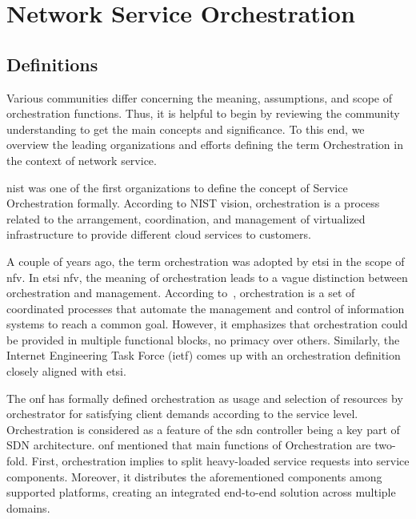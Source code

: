 \section{Network Service Orchestration}
\label{sec:nso}

\subsection{Definitions}
\label{sec:orchdef}

Various communities differ concerning the meaning, assumptions, and scope of orchestration functions. Thus, it is helpful to begin by reviewing the community understanding to get the main concepts and significance. To this end, we overview the leading organizations and efforts defining the term Orchestration in the context of network service.

\gls{nist} \cite{Bohn2011NISTArchitecture} was one of the first organizations to define the concept of Service Orchestration formally. According to NIST vision, orchestration is a process related to the arrangement, coordination, and management of virtualized infrastructure to provide different cloud services to customers.

A couple of years ago, the term orchestration was adopted by \gls{etsi} in the scope of \gls{nfv}. In \gls{etsi} \gls{nfv}, the meaning of orchestration leads to a vague distinction between orchestration and management. According to~\cite{ETSIISG2018}, orchestration is a set of coordinated processes that automate the management and control of information systems to reach a common goal. However, it emphasizes that orchestration could be provided in multiple functional blocks, no primacy over others. Similarly, the Internet Engineering Task Force (\gls{ietf}) comes up with an orchestration definition closely aligned with \gls{etsi}. 

The \gls{onf} \cite{OpenNetworkingFoundation2016FrameworkNetworks} has formally defined orchestration as usage and selection of resources by orchestrator for satisfying client demands according to the service level. Orchestration is considered as a feature of the \gls{sdn} controller being a key part of SDN architecture. \gls{onf} mentioned that main functions of Orchestration are two-fold. First, orchestration implies to split heavy-loaded service requests into service components. Moreover, it distributes the aforementioned components among supported platforms, creating an integrated end-to-end solution across multiple domains.

